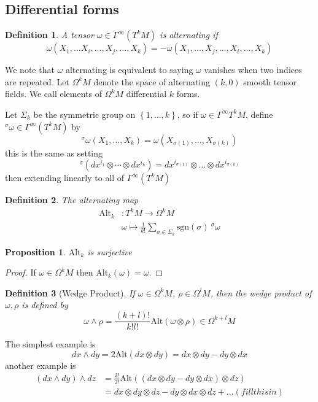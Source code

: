 \documentclass[a4paper]{article}
\newtheorem*{prop}{Proposition}
\newtheorem*{defn}{Definition}
\begin{document}
\subsection*{Differential forms}%
\begin{defn}
  A tensor $\omega \in \Gamma^\infty(T^kM)$ is alternating if 
\[
  \omega(X_1, \dots X_i, \dots, X_j, \dots, X_k) = -\omega(X_1, \dots, X_j, \dots, X_i, \dots, X_k) 
\]
\end{defn}
We note that $\omega$ alternating is equivalent to saying $\omega$ vanishes when two indices are repeated. Let $\Omega^kM$ denote the space of alternating $(k,0)$ smooth tensor fields. We call elements of $\Omega^kM$ differential $k$ forms.

Let $\Sigma_k$ be the symmetric group on $\left\{ 1, \dots, k \right\}$, so if $ \omega \in \Gamma^\infty T^kM$, define $^\sigma \omega \in \Gamma^{\infty} (T^kM)$ by
\[
  ^\sigma \omega(X_1, \dots, X_k) = \omega (X_{\sigma(1)}, \dots, X_{\sigma(k)})
\]
this is the same as setting
\[
  ^\sigma \left( dx^{i_1} \otimes \cdots \otimes dx^{i_k} \right) = dx^{i_{\sigma(1)}} \otimes \dots \otimes dx^{i_{\sigma(k)}}
\]
then extending linearly to all of $\Gamma^\infty (T^kM)$

\begin{defn}
  The alternating map 
  \[
    \begin{aligned}
      \text{Alt}_k&: T^k M \rightarrow \Omega^k M \\
                  &\omega \mapsto \frac{1}{k!} \sum_{\sigma \in \Sigma_k} \text{sgn}(\sigma)\ ^\sigma\omega
    \end{aligned}
  \]
\end{defn}

\begin{prop}
  $\text{Alt}_k$ is surjective
\end{prop}
\begin{proof}
  If $\omega \in \Omega^k M$ then $\text{Alt}_k (\omega) = \omega$.
\end{proof}

\begin{defn}[Wedge Product]
  If $\omega \in \Omega^kM$, $\rho \in \Omega^lM$, then the wedge product of $\omega, \rho$ is defined by
  \[
    \omega \wedge \rho = \frac{(k+l)!}{k!l!} \text{Alt}(\omega \otimes \rho) \in \Omega^{k+l}M
  \]
\end{defn}
The simplest example is 
\[
  dx \wedge dy = 2 \text{Alt}(dx \otimes dy) = dx \otimes dy - dy \otimes dx
\]
another example is
\[
  \begin{aligned}
    (dx \wedge dy) \wedge dz &= \frac{3!}{2!} \text{Alt}((dx \otimes dy - dy \otimes dx) \otimes dz) \\
                             &= dx \otimes dy \otimes dz - dy \otimes dx \otimes dz + \dots (fill this in)
  \end{aligned}
\]
\end{document}
